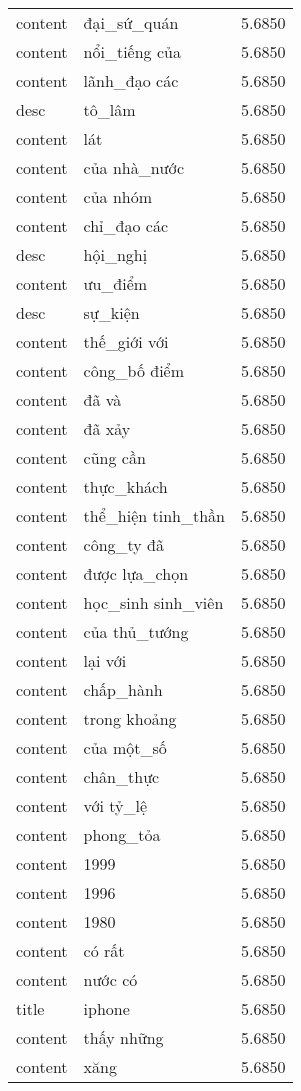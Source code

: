 \documentclass{article}
\begin{document}
\begin{tabular}{lll}
content & đại\_sứ\_quán & 5.6850\\
content & nổi\_tiếng của & 5.6850\\
content & lãnh\_đạo các & 5.6850\\
desc & tô\_lâm & 5.6850\\
content & lát & 5.6850\\
content & của nhà\_nước & 5.6850\\
content & của nhóm & 5.6850\\
content & chỉ\_đạo các & 5.6850\\
desc & hội\_nghị & 5.6850\\
content & ưu\_điểm & 5.6850\\
desc & sự\_kiện & 5.6850\\
content & thế\_giới với & 5.6850\\
content & công\_bố điểm & 5.6850\\
content & đã và & 5.6850\\
content & đã xảy & 5.6850\\
content & cũng cần & 5.6850\\
content & thực\_khách & 5.6850\\
content & thể\_hiện tinh\_thần & 5.6850\\
content & công\_ty đã & 5.6850\\
content & được lựa\_chọn & 5.6850\\
content & học\_sinh sinh\_viên & 5.6850\\
content & của thủ\_tướng & 5.6850\\
content & lại với & 5.6850\\
content & chấp\_hành & 5.6850\\
content & trong khoảng & 5.6850\\
content & của một\_số & 5.6850\\
content & chân\_thực & 5.6850\\
content & với tỷ\_lệ & 5.6850\\
content & phong\_tỏa & 5.6850\\
content & 1999 & 5.6850\\
content & 1996 & 5.6850\\
content & 1980 & 5.6850\\
content & có rất & 5.6850\\
content & nước có & 5.6850\\
title & iphone & 5.6850\\
content & thấy những & 5.6850\\
content & xăng & 5.6850\\

\end{tabular}
\end{document}
